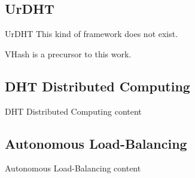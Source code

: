\documentclass[11pt]{beamer}
\begin{document}
\subsection{UrDHT}
\begin{frame}{UrDHT}
	This kind of framework does not exist.
	
	VHash is a precursor to this work.
\end{frame}



\subsection{DHT Distributed Computing}
\begin{frame}{DHT Distributed Computing}
	content
\end{frame}



\subsection{Autonomous Load-Balancing}
\begin{frame}{Autonomous Load-Balancing}
	content
\end{frame}




\end{document}
